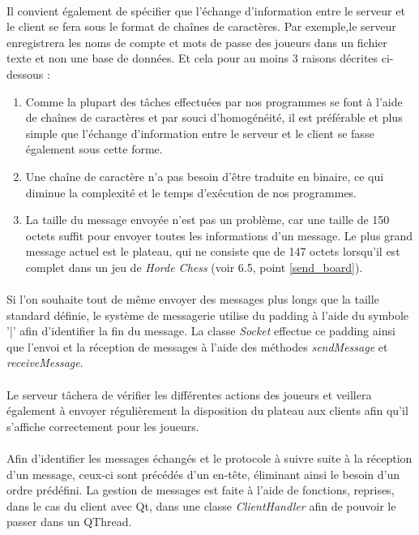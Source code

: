 \documentclass[10pt, a4paper]{article}
\begin{document}
\paragraph{}Il convient également de spécifier que l'échange d'information entre le serveur et le client se fera sous le format de chaînes de caractères. Par exemple,le serveur enregistrera les noms de compte et mots de passe des joueurs dans un fichier texte et non une base de données. Et cela pour au moins 3 raisons décrites ci-dessous :
\begin{enumerate}
\item Comme la plupart des tâches effectuées par nos programmes se font à l'aide de chaînes de caractères et par souci d'homogénéité, il est préférable et plus simple que l'échange d'information entre le serveur et le client se fasse également sous cette forme.
\item Une chaîne de caractère n'a pas besoin d'être traduite en binaire, ce qui diminue la complexité et le temps d'exécution de nos programmes.
\item La taille du message envoyée n'est pas un problème, car une taille de 150 octets suffit pour envoyer toutes les informations d'un message. Le plus grand message actuel est le plateau, qui ne consiste que de 147 octets lorsqu'il est complet dans un jeu de \textit{Horde Chess} (voir 6.5, point \ref{send_board}).
\end{enumerate}
\paragraph{}Si l'on souhaite tout de même envoyer des messages plus longs que la taille standard définie, le système de messagerie utilise du padding à l'aide du symbole '|' afin d'identifier la fin du message. La classe \textit{Socket} effectue ce padding ainsi que l'envoi et la réception de messages à l'aide des méthodes \textit{sendMessage} et \textit{receiveMessage}.
\paragraph{}Le serveur tâchera de vérifier les différentes actions des joueurs et veillera également à envoyer régulièrement la disposition du plateau aux clients afin qu'il s'affiche correctement pour les joueurs.
\paragraph{}Afin d'identifier les messages échangés et le protocole à suivre suite à la réception d'un message, ceux-ci sont précédés d'un en-tête, éliminant ainsi le besoin d'un ordre prédéfini. La gestion de messages est faite à l'aide de fonctions, reprises, dans le cas du client avec Qt, dans une classe \textit{ClientHandler} afin de pouvoir le passer dans un QThread.
\end{document}
